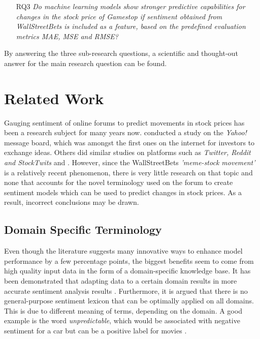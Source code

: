 \documentclass[11pt, a4paper]{article}
\begin{document}
\begin{itemize}
    \item[RQ3] \emph{Do machine learning models show stronger predictive capabilities for changes in the stock price of Gamestop if sentiment obtained from WallStreetBets is included as a feature, based on the predefined evaluation metrics MAE, MSE and RMSE?}
\end{itemize}

By answering the three sub-research questions, a scientific and thought-out answer for the main research question can be found.



\section{Related Work}
Gauging sentiment of online forums to predict movements in stock prices has been a research subject for many years now. 
\cite{das2007yahoo} conducted a study on the \emph{Yahoo!} message board, which was amongst the first ones on the internet for investors to exchange ideas.
Others did similar studies on platforms such as \emph{Twitter, Reddit and StockTwits} and \citep{gu2020twtrsentiment, anand2021WallstreetbetsAgainstWallstreet, chousa2017socialmedia}.
However, since the WallStreetBets \emph{'meme-stock movement'} is a relatively recent phenomenon, there is very little research on that topic and none that accounts for the novel
terminology used on the forum to create sentiment models which can be used to predict changes in stock prices. As a result, incorrect conclusions may be drawn.

\subsection{Domain Specific Terminology}
Even though the literature suggests many 
innovative ways to enhance model performance by a few percentage points, the biggest benefits seem to come from high quality 
input data in the form of a domain-specific knowledge base. It has been demonstrated that adapting data to a certain domain
results in more accurate sentiment analysis results \citep{park2015EfficientExtraction}.
Furthermore, it is argued that there is no general-purpose sentiment lexicon that can be optimally applied on all domains. 
This is due to different meaning of terms, depending on the domain. A good example is the word \emph{unpredictable}, 
which would be associated with negative sentiment for a car but can be a positive label for movies \citep{bo2008opinionmining}.
\end{document}
